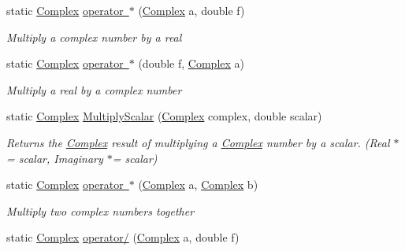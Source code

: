 \begin{DoxyCompactItemize}
static \mbox{\hyperlink{struct_c_s_i_1_1_library_1_1_data_types_1_1_complex}{Complex}} \mbox{\hyperlink{struct_c_s_i_1_1_library_1_1_data_types_1_1_complex_a90f5ebb798a031197d2f5b93bc528570}{operator $\ast$}} (\mbox{\hyperlink{struct_c_s_i_1_1_library_1_1_data_types_1_1_complex}{Complex}} a, double f)
\begin{DoxyCompactList}\small\item\em Multiply a complex number by a real \end{DoxyCompactList}\item 
static \mbox{\hyperlink{struct_c_s_i_1_1_library_1_1_data_types_1_1_complex}{Complex}} \mbox{\hyperlink{struct_c_s_i_1_1_library_1_1_data_types_1_1_complex_a58f4af6281aab31aa595cb59ba8656eb}{operator $\ast$}} (double f, \mbox{\hyperlink{struct_c_s_i_1_1_library_1_1_data_types_1_1_complex}{Complex}} a)
\begin{DoxyCompactList}\small\item\em Multiply a real by a complex number \end{DoxyCompactList}\item 
static \mbox{\hyperlink{struct_c_s_i_1_1_library_1_1_data_types_1_1_complex}{Complex}} \mbox{\hyperlink{struct_c_s_i_1_1_library_1_1_data_types_1_1_complex_a63bafff9c14f0c10a5b6042b3bd4116e}{Multiply\+Scalar}} (\mbox{\hyperlink{struct_c_s_i_1_1_library_1_1_data_types_1_1_complex}{Complex}} complex, double scalar)
\begin{DoxyCompactList}\small\item\em Returns the \mbox{\hyperlink{struct_c_s_i_1_1_library_1_1_data_types_1_1_complex}{Complex}} result of multiplying a \mbox{\hyperlink{struct_c_s_i_1_1_library_1_1_data_types_1_1_complex}{Complex}} number by a scalar. (Real $\ast$= scalar, Imaginary $\ast$= scalar) \end{DoxyCompactList}\item 
static \mbox{\hyperlink{struct_c_s_i_1_1_library_1_1_data_types_1_1_complex}{Complex}} \mbox{\hyperlink{struct_c_s_i_1_1_library_1_1_data_types_1_1_complex_a29914d0aef04f55ee652187554e5d5d0}{operator $\ast$}} (\mbox{\hyperlink{struct_c_s_i_1_1_library_1_1_data_types_1_1_complex}{Complex}} a, \mbox{\hyperlink{struct_c_s_i_1_1_library_1_1_data_types_1_1_complex}{Complex}} b)
\begin{DoxyCompactList}\small\item\em Multiply two complex numbers together \end{DoxyCompactList}\item 
static \mbox{\hyperlink{struct_c_s_i_1_1_library_1_1_data_types_1_1_complex}{Complex}} \mbox{\hyperlink{struct_c_s_i_1_1_library_1_1_data_types_1_1_complex_a206652a66232fd3ce1764db50b548989}{operator/}} (\mbox{\hyperlink{struct_c_s_i_1_1_library_1_1_data_types_1_1_complex}{Complex}} a, double f)

\end{DoxyCompactItemize}
